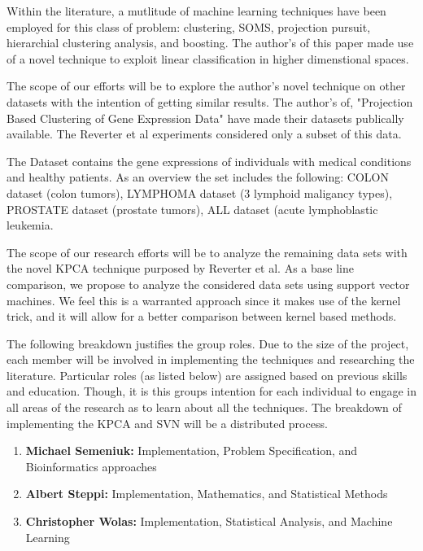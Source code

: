 \documentclass[10pt,a4,oneside]{report}
\begin{document}
Within the literature, a mutlitude of machine learning techniques have been employed for this class of problem: clustering, SOMS, projection pursuit, hierarchial clustering analysis, and boosting. The author's of this paper made use of a novel technique to exploit linear classification in higher dimenstional spaces.

The scope of our efforts will be to explore the author's novel technique on other datasets with the intention of getting similar results. The author's of, "Projection Based Clustering of Gene Expression Data" \cite{TasoulisPT09} have made their datasets publically available. The Reverter et al experiments considered only a subset of this data.

The Dataset contains the gene expressions of individuals with medical conditions and healthy patients. As an overview the set includes the following: COLON dataset (colon tumors), LYMPHOMA dataset (3 lymphoid maligancy types), PROSTATE dataset (prostate tumors), ALL dataset (acute lymphoblastic leukemia.

The scope of our research efforts will be to analyze the remaining data sets with the novel KPCA technique purposed by Reverter et al. As a base line comparison, we propose to analyze the considered data sets using support vector machines. We feel this is a warranted approach since it makes use of the kernel trick, and it will allow for a better comparison between kernel based methods.

The following breakdown justifies the group roles. Due to the size of the project, each member will be involved in implementing the techniques and researching the literature. Particular roles (as listed below) are assigned based on previous skills and education. Though, it is this groups intention for each individual to engage in all areas of the research as to learn about all the techniques. The breakdown of implementing the KPCA and SVN will be a distributed process.
\begin{enumerate}  \itemsep -2pt %
\item
{\bf Michael Semeniuk:} Implementation, Problem Specification, and Bioinformatics approaches
\item
{\bf Albert Steppi:} Implementation, Mathematics, and Statistical Methods
\item
{\bf Christopher Wolas:} Implementation, Statistical Analysis, and Machine Learning  
\end{enumerate}

\end{document}
